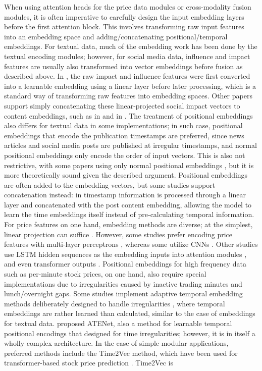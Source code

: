 \documentclass[stu,floatsintext]{apa7}
\begin{document}
When using attention heads for the price data modules or cross-modality fusion modules, it is often imperative to carefully design the input embedding layers before the first attention block. This involves transforming raw input features into an embedding space and adding/concatenating positional/temporal embeddings. For textual data, much of the embedding work has been done by the textual encoding modules; however, for social media data, influence and impact features are usually also transformed into vector embeddings before fusion as described above. In \textcite{he2021multimodal}, the raw impact and influence features were first converted into a learnable embedding using a linear layer before later processing, which is a standard way of transforming raw features into embedding spaces. Other papers support simply concatenating these linear-projected social impact vectors to content embeddings, such as in \textcite{wang2022febdnn} and in \textcite{daniluk2021synerise}. The treatment of positional embeddings also differs for textual data in some implementations; in such case, positional embeddings that encode the publication timestamps \parencite{he2021multimodal} are preferred, since news articles and social media posts are published at irregular timestamps, and normal positional embeddings only encode the order of input vectors. This is also not restrictive, with some papers using only normal positional embeddings \parencite{dashtaki2025hsif}, but it is more theoretically sound given the described argument. Positional embeddings are often added to the embedding vectors, but some studies support concatenation instead: in \textcite{zhang2024viral} timestamp information is processed through a linear layer and concatenated with the post content embedding, allowing the model to learn the time embeddings itself instead of pre-calculating temporal information. For price features on one hand, embedding methods are diverse; at the simplest, linear projection can suffice \parencite{omranpour2024transformer}. However, some studies prefer encoding price features with multi-layer perceptrons \parencite{jang2025selective,chen2026newsdriven}, whereas some utilize CNNs \parencite{mandal2023enhancing}. Other studies use LSTM hidden sequences as the embedding inputs into attention modules \parencite{fataliyev2023mcasp,sun2026intelligent,sun2021twochannel}, and even transformer outputs \parencite{bustarviejo2026multimodal,dashtaki2025hsif}. Positional embeddings for high frequency data such as per-minute stock prices, on one hand, also require special implementations due to irregularities caused by inactive trading minutes and lunch/overnight gaps. Some studies implement adaptive temporal embedding methods deliberately designed to handle irregularities \parencite{vogel2025transformerbased}, where temporal embeddings are rather learned than calculated, similar to the case of embeddings for textual data. \textcite{lee2026adaptive} proposed ATENet, also a method for learnable temporal positional encodings that designed for time irregularities; however, it is in itself a wholly complex architecture. In the case of simple modular applications, preferred methods include the Time2Vec method, which have been used for transformer-based stock price prediction \parencite{lee2025stock}. Time2Vec is 
\end{document}
